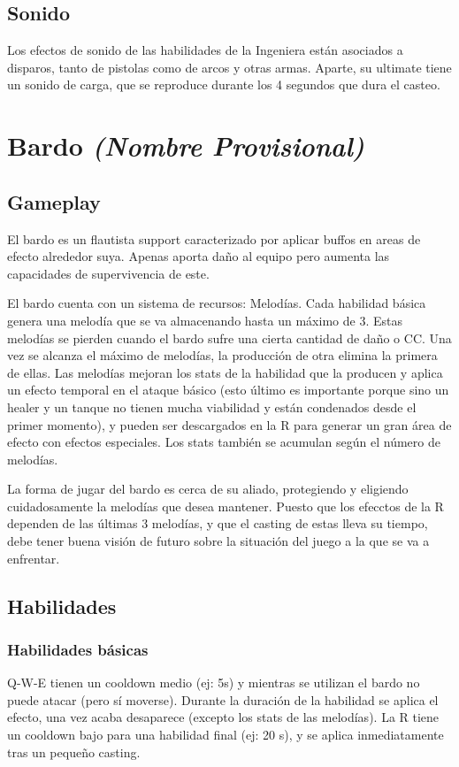 \subsection{Sonido}
Los efectos de sonido de las habilidades de la Ingeniera están asociados a disparos, tanto de pistolas como de arcos y otras armas. Aparte, su ultimate tiene un sonido de carga, que se reproduce durante los 4 segundos que dura el casteo.


\section{Bardo \emph{(Nombre Provisional)}}

\subsection{Gameplay}
El bardo es un flautista support caracterizado por aplicar buffos en areas de efecto alrededor suya. Apenas aporta daño al equipo pero aumenta las capacidades de supervivencia de este.

El bardo cuenta con un sistema de recursos: Melodías. Cada habilidad básica genera una melodía que se va almacenando hasta un máximo de 3. Estas melodías se pierden cuando el bardo sufre una cierta cantidad de daño o CC. Una vez se alcanza el máximo de melodías, la producción de otra elimina la primera de ellas.
Las melodías mejoran los stats de la habilidad que la producen y aplica un efecto temporal en el ataque básico (esto último es importante porque sino un healer y un tanque no tienen mucha viabilidad y están condenados desde el primer momento), y pueden ser descargados en la R para generar un gran área de efecto con efectos especiales. Los stats también se acumulan según el número de melodías.

La forma de jugar del bardo es cerca de su aliado, protegiendo y eligiendo cuidadosamente la melodías que desea mantener. Puesto que los efecctos de la R dependen de las últimas 3 melodías, y que el casting de estas lleva su tiempo, debe tener buena visión de futuro sobre la situación del juego a la que se va a enfrentar.

\subsection{Habilidades}
\subsubsection{Habilidades básicas}
Q-W-E tienen un cooldown medio (ej: 5s) y mientras se utilizan el bardo no puede atacar (pero sí moverse). Durante la duración de la habilidad se aplica el efecto, una vez acaba desaparece (excepto los stats de las melodías). La R tiene un cooldown bajo para una habilidad final (ej: 20 s), y se aplica inmediatamente tras un pequeño casting.

